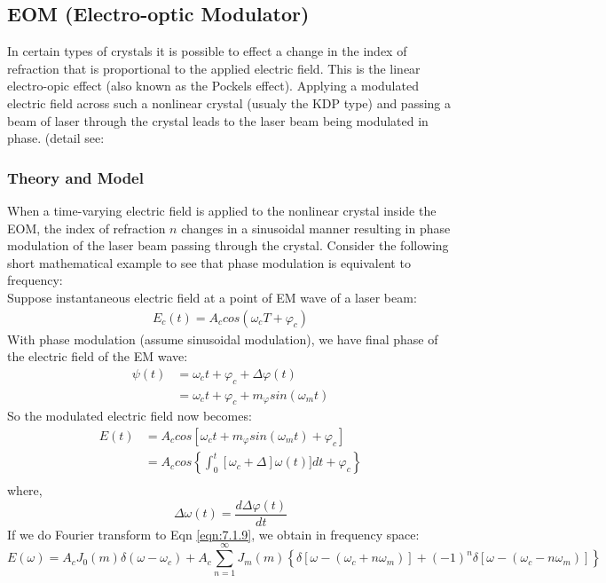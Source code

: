 \documentclass[11pt,A4Paper]{article}
\begin{document}
\subsection{EOM (Electro-optic Modulator)}
In certain types of crystals it is possible to effect a change in the index of refraction that is proportional to the applied electric field. This is the linear electro-opic effect (also known as the Pockels effect). Applying a modulated electric field across such a nonlinear crystal (usualy the KDP type) and passing a beam of laser through the crystal leads to the laser beam being modulated in phase. (detail see: \cite{fundamentalsOfPhotonics}

\subsubsection{Theory and Model}
When a time-varying electric field is applied to the nonlinear crystal inside the EOM, the index of refraction $n$ changes in a sinusoidal manner resulting in phase modulation of the laser beam passing through the crystal. Consider the following short mathematical example to see that phase modulation is equivalent to frequency: 
\\
Suppose instantaneous electric field at a point of EM wave of a laser beam: 
\begin{align*}
    E_c(t) = A_c cos(\omega_c T + \varphi_c)
\end{align*}
With phase modulation (assume sinusoidal modulation), we have final phase of the electric field of the EM wave: 
\begin{align*}
    \psi(t) &= \omega_c t + \varphi_c + \Delta \varphi (t) \\
            &= \omega_c t + \varphi_c + m_{\varphi} sin(\omega_m t)
\end{align*}
So the modulated electric field now becomes: 
\begin{align}
    E(t) &= A_c cos[ \omega_c t + m_{\varphi} sin(\omega_m t) + \varphi_c] \label{eqn:7.1.9}\\
         &= A_c cos\left\{  \int_0^t [ \omega_c + \Delta ]\omega(t)] dt + \varphi_c \right\} \\
\end{align}
where, 
\begin{equation*}
    \Delta \omega (t) = \frac{d\Delta \varphi (t)}{dt}
\end{equation*}
If we do Fourier transform to Eqn \ref{eqn:7.1.9}, we obtain in frequency space: 
\begin{equation}
    E(\omega) = A_c J_0(m) \delta(\omega - \omega_c) + A_c\sum_{n=1}^\infty J_m(m) \left\{ \delta[\omega-(\omega_c + n\omega_m)] +(-1)^n\delta[\omega-(\omega_c-n\omega_m)]\right\}
    \label{eqn:7.1.10}
\end{equation}
\end{document}
